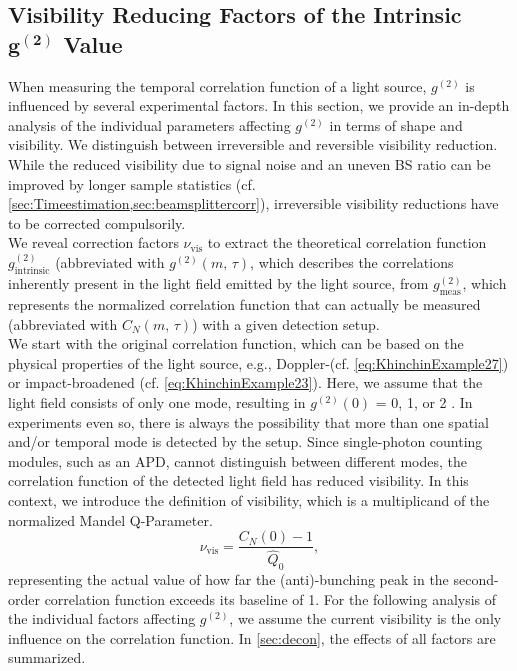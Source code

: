 \subsection{Visibility Reducing Factors of the Intrinsic \texorpdfstring{$\boldsymbol{g^{(2)}}$ Value}{g2}}\label{sec:g2_visibility}
When measuring the temporal correlation function of a light source, $g^{(2)}$ is influenced by several experimental factors. In this section, we provide an in-depth analysis of the 
individual parameters affecting $g^{(2)}$ in terms of shape and visibility. We distinguish between irreversible and reversible visibility reduction. While the reduced visibility due to signal noise and an uneven \ac{BS} ratio can be improved by longer sample statistics (cf. \cref{sec:Timeestimation,sec:beamsplittercorr}), irreversible visibility reductions have to be corrected compulsorily.\\
We reveal correction factors $\nu_\mathrm{vis}$ to extract the theoretical correlation function $g^{(2)}_\mathrm{intrinsic}$ (abbreviated with $g^{(2)}(m,\,\tau)$, which describes the correlations inherently present in the light field emitted by the light source, from $g^{(2)}_\mathrm{meas}$, which represents the normalized correlation function that can actually be measured (abbreviated with $C_N(m,\,\tau)$) with a given detection setup.\\
We start with the original correlation function, which can be based on the physical properties of the light source, e.g., Doppler-(cf. \cref{eq:KhinchinExample27}) or impact-broadened (cf. \cref{eq:KhinchinExample23}). Here, we assume that the light field consists of only one mode, resulting in $g^{(2)}(0)$ = 0, 1, or 2 . In experiments even so, there is always the possibility that more than one spatial and/or temporal mode is detected by the setup. Since single-photon counting modules, such as an \ac{APD}, cannot distinguish between different modes, the correlation function of the detected light field has reduced visibility. In this context, we introduce the definition of visibility, which is a multiplicand of the normalized Mandel Q-Parameter.
\begin{equation}\label{eq:vis}
	\nu_\mathrm{vis}=\dfrac{C_N(0)-1}{\hat{Q}_0},
\end{equation}
representing the actual value of how far the (anti)-bunching peak in the second-order correlation function exceeds its baseline of 1. 
For the following analysis of the individual factors affecting $g^{(2)}$, we assume the current visibility is the only influence on the correlation function. In \cref{sec:decon}, the effects of all factors are summarized.

